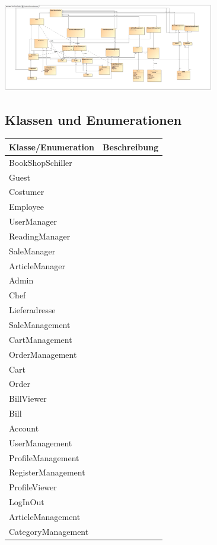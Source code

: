 \documentclass[a4paper]{article}
\begin{document}
\includegraphics[width=350px]{analyse-klassendiagramm.jpg}

\subsection{Klassen und Enumerationen}

\begin{tabular}{|l|l|}
	\hline
	\rowcolor[HTML]{C0C0C0} 
	Klasse/Enumeration & Beschreibung \\ \hline
	BookShopSchiller &  \\ \hline
	Guest &  \\ \hline
	Costumer &  \\ \hline
	Employee &  \\ \hline
	UserManager &  \\ \hline
	ReadingManager &  \\ \hline
	SaleManager &  \\ \hline
	ArticleManager &  \\ \hline
	Admin &  \\ \hline
	Chef &  \\ \hline
	Lieferadresse &  \\ \hline
	SaleManagement &  \\ \hline
	CartManagement &  \\ \hline
	OrderManagement &  \\ \hline
	Cart &  \\ \hline
	Order &  \\ \hline
	BillViewer &  \\ \hline
	Bill &  \\ \hline
	Account	 &  \\ \hline
	UserManagement  &  \\ \hline
	ProfileManagement &  \\ \hline
	RegisterManagement &  \\ \hline
	ProfileViewer &  \\ \hline
	LogInOut &  \\ \hline
	ArticleManagement &  \\ \hline
	CategoryManagement &  \\ \hline

\end{tabular}
\end{document}
